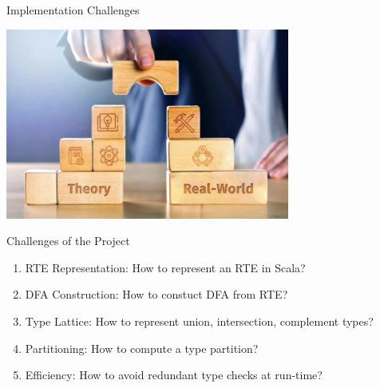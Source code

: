 {  
  \begin{frame}{Implementation Challenges}
      
  \centering
  \includegraphics[width=0.7\textwidth]{theoretic-challenge.png}
\end{frame}
}

\begin{frame}{Challenges of the Project}
  \begin{enumerate}
  \item RTE Representation:   How to represent an RTE in Scala?
  \item DFA Construction:  How to constuct DFA from RTE?
  \item Type Lattice: How to represent union, intersection, complement types?
  \item Partitioning: How to compute a type partition?
  \item Efficiency:  How to avoid redundant type checks at run-time?
  \end{enumerate}
\end{frame}
